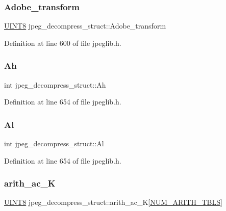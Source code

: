 \subsubsection{\texorpdfstring{Adobe\_transform}{Adobe\_transform}}
{\footnotesize\ttfamily \mbox{\hyperlink{jmorecfg_8h_adfb9a8ea1dd59f151065f763e1e9acd6}{U\+I\+N\+T8}} jpeg\+\_\+decompress\+\_\+struct\+::\+Adobe\+\_\+transform}



Definition at line 600 of file jpeglib.\+h.

\mbox{\label{structjpeg__decompress__struct_a2df559c55319d0c785b91e95960bea55}} 
\subsubsection{\texorpdfstring{Ah}{Ah}}
{\footnotesize\ttfamily int jpeg\+\_\+decompress\+\_\+struct\+::\+Ah}



Definition at line 654 of file jpeglib.\+h.

\mbox{\label{structjpeg__decompress__struct_a1dfbdcc8449dbc329a352a75d4046154}} 
\subsubsection{\texorpdfstring{Al}{Al}}
{\footnotesize\ttfamily int jpeg\+\_\+decompress\+\_\+struct\+::\+Al}



Definition at line 654 of file jpeglib.\+h.

\mbox{\label{structjpeg__decompress__struct_a9c54eeff8fd2af185c34be22e5c21420}} 
\subsubsection{\texorpdfstring{arith\_ac\_K}{arith\_ac\_K}}
{\footnotesize\ttfamily \mbox{\hyperlink{jmorecfg_8h_adfb9a8ea1dd59f151065f763e1e9acd6}{U\+I\+N\+T8}} jpeg\+\_\+decompress\+\_\+struct\+::arith\+\_\+ac\+\_\+K\mbox{[}\mbox{\hyperlink{jpeglib_8h_a4efb0fccc8d9db72ca18f32a26fad6ab}{N\+U\+M\+\_\+\+A\+R\+I\+T\+H\+\_\+\+T\+B\+LS}}\mbox{]}}



